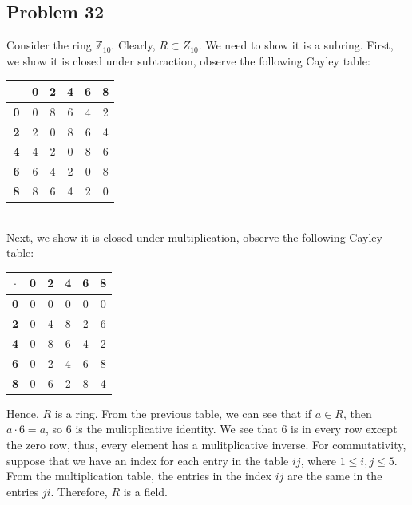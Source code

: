 \documentclass[a4paper,12pt]{article}
\begin{document}
\subsection*{Problem 32}
Consider the ring $\mathbb{Z}_{10}.$ Clearly, $R \subset Z_{10}$. We need to show it is a subring. First, we show it is closed under subtraction, observe the following Cayley table:
\begin{table}[h]
    \centering
    \begin{tabular}{|c|c|c|c|c|c|}
        \hline
      $-$ & \textbf{0} & \textbf{2} & \textbf{4} & \textbf{6} & \textbf{8} \\
      \hline
      \textbf{0} & 0 & 8 & 6 & 4 & 2 \\
      \hline
      \textbf{2} & 2 & 0 & 8 & 6 & 4 \\
      \hline
      \textbf{4} & 4 & 2 & 0 & 8 & 6 \\
      \hline
      \textbf{6} & 6 & 4 & 2 & 0 & 8 \\
      \hline
      \textbf{8} & 8 & 6 & 4 & 2 & 0 \\
      \hline
    \end{tabular}
\end{table}
\\Next, we show it is closed under multiplication, observe the following Cayley table:
\begin{table}[h]
    \centering
    \begin{tabular}{|c|c|c|c|c|c|}
        \hline
      $\cdot$ & \textbf{0} & \textbf{2} & \textbf{4} & \textbf{6} & \textbf{8} \\
      \hline
      \textbf{0} & 0 & 0 & 0 & 0 & 0 \\
      \hline
      \textbf{2} & 0 & 4 & 8 & 2 & 6 \\
      \hline
      \textbf{4} & 0 & 8 & 6 & 4 & 2 \\
      \hline
      \textbf{6} & 0 & 2 & 4 & 6 & 8 \\
      \hline
      \textbf{8} & 0 & 6 & 2 & 8 & 4 \\
      \hline
    \end{tabular}
\end{table}
Hence, $R$ is a ring. From the previous table, we can see that if $a \in R$, then $a \cdot 6 =a$, so $6$ is the mulitplicative identity. We see that $6$ is in every row except the zero row, thus, every element has a mulitplicative inverse. For commutativity, suppose that we have an index for each entry in the table $ij$, where $1\le i,j \le 5$. From the multiplication table, the entries in the index $ij$ are the same in the entries $ji.$ Therefore, $R$ is a field.
\end{document}

